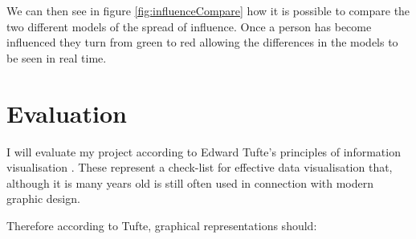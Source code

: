 \documentclass[12pt,a4paper]{article}
\begin{document}
We can then see in figure \ref{fig:influenceCompare} how it is possible to compare the two different models of the spread of influence. Once a person has become influenced they turn from green to red allowing the differences in the models to be seen in real time.

\section{Evaluation}

I will evaluate my project according to Edward Tufte's principles of information visualisation \cite{tufte1983visual}. These represent a check-list for effective data visualisation that, although it is many years old is still often used in connection with modern graphic design.

Therefore according to Tufte, graphical representations should:
\end{document}
